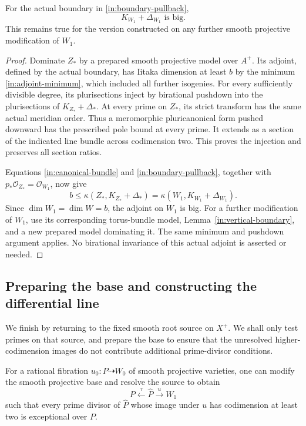 \begin{proposition}\label{in:base-big}
For the actual boundary in \eqref{in:boundary-pullback},
\[
 K_{W_1}+\Delta_{W_1}\text{ is big}.
\]
This remains true for the version constructed on any further smooth
projective modification of $W_1$.
\end{proposition}

\begin{proof}
Dominate $Z_*$ by a prepared smooth projective model over $A^+$.
Its adjoint, defined by the actual boundary, has Iitaka dimension
at least $b$ by the minimum
\eqref{in:adjoint-minimum}, which included all further isogenies.
For every sufficiently divisible degree, its plurisections inject by
birational pushdown into the plurisections of $K_{Z_*}+\Delta_*$.
At every prime on $Z_*$, its strict transform has the same actual
meridian order.  Thus a meromorphic pluricanonical form pushed
downward has the prescribed pole bound at every prime.  It extends
as a section of the indicated line bundle across codimension two.
This proves the injection and preserves all section ratios.

Equations \eqref{in:canonical-bundle} and
\eqref{in:boundary-pullback}, together with
$p_*\mathcal O_{Z_*}=\mathcal O_{W_1}$, now give
\[
 b\le\kappa(Z_*,K_{Z_*}+\Delta_*)
   =\kappa(W_1,K_{W_1}+\Delta_{W_1}).
\]
Since $\dim W_1=\dim W=b$, the adjoint on $W_1$ is big.  For a
further modification of $W_1$, use its corresponding torus-bundle
model, Lemma~\ref{in:vertical-boundary}, and a new prepared model
dominating it.  The same minimum and pushdown argument applies.
No birational invariance of this actual adjoint is asserted or needed.
\end{proof}

\subsection{Preparing the base and constructing the differential line}

We finish by returning to the fixed smooth root source on $X^+$.
We shall only test primes on that source, and prepare the base to
ensure that the unresolved higher-codimension images do not contribute
additional prime-divisor conditions.

\begin{lemma}\label{in:neatness}
For a rational fibration $u_0:P\dashrightarrow W_0$ of smooth
projective varieties, one can modify the smooth projective base and
resolve the source to obtain
\[
 P\xleftarrow{\tau}\widehat P\overset{u}{\longrightarrow}W_1
\]
such that every prime divisor of $\widehat P$ whose image under $u$
has codimension at least two is exceptional over $P$.
\end{lemma}

